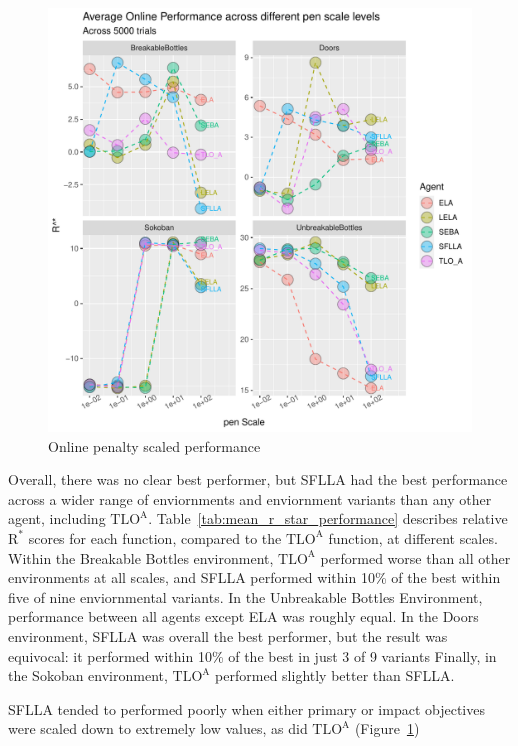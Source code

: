 \begin{figure}[h]
  \centering
  \includegraphics[width=\linewidth]{output/online performance_pen.pdf}
  \caption{Online penalty scaled performance}
  \label{fig:offline_pen_performance2}
\end{figure}

Overall, there was no clear best performer, but SFLLA had the best performance across a wider range of enviornments and enviornment variants than any other agent, including  $\text{TLO}^\text{A}$. Table~\ref{tab:mean_r_star_performance} describes relative $\text{R}^*$ scores for each function, compared to the $\text{TLO}^\text{A}$ function, at different scales.  Within the Breakable Bottles environment, $\text{TLO}^\text{A}$ performed worse than all other environments at all scales, and SFLLA performed within 10\% of the best within five of nine enviornmental variants. In the Unbreakable Bottles Environment, performance between all agents except ELA was roughly equal. In the Doors environment, SFLLA was overall the best performer, but the result was equivocal: it performed within 10\% of the best in just 3 of 9 variants Finally, in the Sokoban environment, $\text{TLO}^\text{A}$ performed slightly better than SFLLA.

SFLLA tended to performed poorly when either primary or impact objectives were scaled down to extremely low values, as did $\text{TLO}^\text{A}$ (Figure~\ref{fig:offline_pen_performance2})